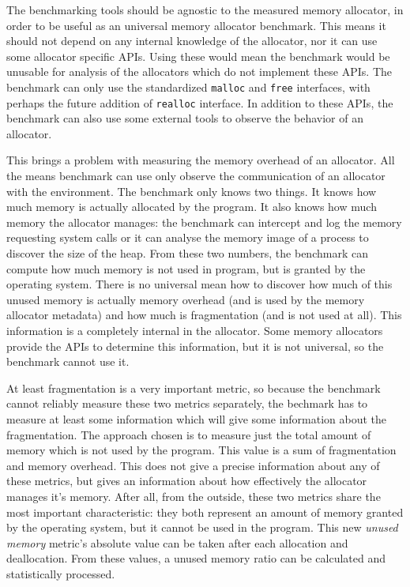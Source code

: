 The benchmarking tools should be agnostic to the measured memory allocator, in
order to be useful as an universal memory allocator benchmark. This means it
should not depend on any internal knowledge of the allocator, nor it can use some
allocator specific APIs. Using these would mean the benchmark would be unusable
for analysis of the allocators which do not implement these APIs. The benchmark
can only use the standardized {\tt malloc} and {\tt free} interfaces, with
perhaps the future addition of {\tt realloc} interface. In addition to these
APIs, the benchmark can also use some external tools to observe the behavior of
an allocator.

This brings a problem with measuring the memory overhead of an allocator. All the
means benchmark can use only observe the communication of an allocator with the
environment. The benchmark only knows two things. It knows how much memory is
actually allocated by the program. It also knows how much memory the allocator
manages: the benchmark can intercept and log the memory requesting system calls
or it can analyse the memory image of a process to discover the size of the heap.
From these two numbers, the benchmark can compute how much memory is not used in
program, but is granted by the operating system. There is no universal mean how
to discover how much of this unused memory is actually memory overhead (and is
used by the memory allocator metadata) and how much is fragmentation (and is not
used at all). This information is a completely internal in the allocator. Some
memory allocators provide the APIs to determine this information, but it is not
universal, so the benchmark cannot use it.

At least fragmentation is a very important metric, so because the benchmark
cannot reliably measure these two metrics separately, the bechmark has to measure
at least some information which will give some information about the
fragmentation. The approach chosen is to measure just the total amount of memory
which is not used by the program. This value is a sum of fragmentation and memory
overhead. This does not give a precise information about any of these metrics,
but gives an information about how effectively the allocator manages it's memory.
After all, from the outside, these two metrics share the most important
characteristic: they both represent an amount of memory granted by the operating
system, but it cannot be used in the program. This new {\em unused memory}
metric's absolute value can be taken after each allocation and deallocation. From
these values, a unused memory ratio can be calculated and statistically
processed.


